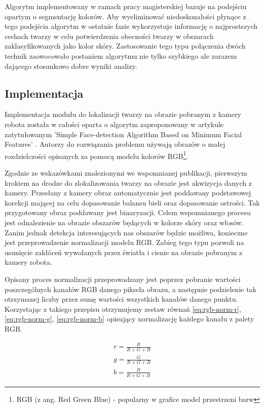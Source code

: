 Algorytm implementowany w ramach pracy magisterskiej bazuje na podejściu opartym
o segmentację kolorów. Aby wyeliminować niedoskonałości płynące z tego podejścia
algorytm w ostatnie fazie wykorzystuje informację o najprostszych cechach twarzy
w celu potwierdzenia obecności twarzy w obszarach zaklasyfikowanych jako kolor
skóry. Zastosowanie tego typu połączenia dwóch technik zaowocowało postaniem
algorytmu nie tylko szybkiego ale zarazem dającego stosunkowo dobre wyniki
analizy.

\subsection{Implementacja}
Implementacja modułu do lokalizacji twarzy na obrazie pobranym z kamery robota
została w całości oparta o algorytm zaproponowany w artykule zatytułowanym 'Simple Face-detection Algorithm Based on Minimum
Facial Features' \cite{SimpleFaceDetectionAlgorithm}. Autorzy do rozwiązania
problemu używają obrazów o małej rozdzielczości opisanych za pomocą modelu
kolorów RGB\footnote{RGB (z ang. Red Green Blue) - popularny w grafice model
przestrzeni barw}.

Zgodnie ze wskazówkami znalezionymi we wspomnianej publikacji, pierwszym krokiem
na drodze do zlokalizowania twarzy na obrazie jest akwizycja danych z kamery.
Przesłany z kamery obraz automatycznie jest poddawany podstawowej korekcji
mającej na celu dopasowanie balansu bieli oraz  dopasowanie ostrości. Tak
przygotowany obraz poddawany jest binaryzacji. Celem wspomnianego procesu jest
odnalezienie na obrazie obszarów będących w kolorze skóry oraz włosów. Zanim
jednak detekcja interesujących nas obszarów będzie możliwa, konieczne jest
przeprowadzenie normalizacji modelu RGB. Zabieg tego typu pozwoli na usunięcie
zakłóceń wywołanych przez światła i cienie na obrazie pobranym z kamery robota.

Opisany proces normalizacji przeprowadzany jest poprzez pobranie wartości
poszczególnych kanałów RGB danego piksela obrazu, a następnie podzielenie tak
otrzymanej liczby przez sumę wartości wszystkich kanałów danego punktu.
Korzystając z takiego przepisu otrzymujemy zestaw równań \ref{eq:rgb-norm-r},
\ref{eq:rgb-norm-g}, \ref{eq:rgb-norm-b} opisujący normalizację każdego kanału z
palety RGB.

\begin{eqnarray}
\label{eq:rgb-norm-r}
r = \frac{R}{R + G +B}\\
\label{eq:rgb-norm-g}
g = \frac{G}{R + G +B}\\
\label{eq:rgb-norm-b}
b = \frac{B}{R + G +B}
\end{eqnarray} 


